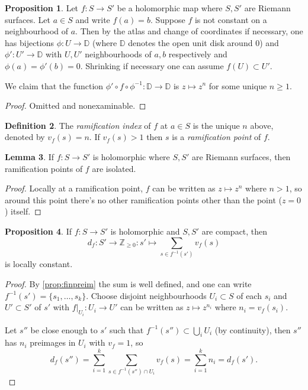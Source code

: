 \documentclass{article}
\newcommand{\D}{\mathbb{D}}
\newcommand{\Z}{\mathbb{Z}}
\theoremstyle{definition}
\newtheorem{defn}{Definition}[subsection]
\newtheorem{prop}[defn]{Proposition}
\newtheorem{lemma}[defn]{Lemma}
\begin{document}
\begin{prop}
\label{prop:zmapstozn}
Let $f:S\rightarrow S'$ be a holomorphic map where $S,S'$ are Riemann surfaces. Let $a\in S$ and write $f(a)=b$. Suppose $f$ is not constant on a neighbourhood of $a$. Then by the atlas and change of coordinates if necessary, one has bijections $\phi:U\rightarrow\D$ (where $\D$ denotes the open unit disk around 0) and $\phi':U'\rightarrow\D$ with $U,U'$ neighbourhoods of $a,b$ respectively and $\phi(a)=\phi'(b)=0$. Shrinking if necessary one can assume $f(U)\subset U'$.

We claim that the function $\phi'\circ f\circ\phi^{-1}:\D\rightarrow\D$ is $z\mapsto z^n$ for some unique $n\geq 1$.
\end{prop}
\begin{proof}
Omitted and nonexaminable.
\end{proof}

\begin{defn}
The \textit{ramification index} of $f$ at $a\in S$ is the unique $n$ above, denoted by $v_f(s)=n$. If $v_f(s)>1$ then $s$ is a \textit{ramification point} of $f$.
\end{defn}

\begin{lemma}
If $f:S\rightarrow S'$ is holomorphic where $S,S'$ are Riemann surfaces, then ramification points of $f$ are isolated.
\end{lemma}
\begin{proof}
Locally at a ramification point, $f$ can be written as $z\mapsto z^n$ where $n>1$, so around this point there's no other ramification points other than the point ($z=0$) itself.
\end{proof}

\begin{prop}
If $f:S\rightarrow S'$ is holomorphic and $S,S'$ are compact, then
\[
d_f:S'\rightarrow\Z_{\geq 0}:s'\mapsto \sum_{s\in f^{-1}(s')}v_f(s)
\]
is locally constant.
\end{prop}
\begin{proof}
By \ref{prop:finpreim} the sum is well defined, and one can write $f^{-1}(s')=\{s_1,\ldots,s_k\}$. Choose disjoint neighbourhoods $U_i\subset S$ of each $s_i$ and $U'\subset S'$ of $s'$ with $\left. f\right|_{U_i}:U_i\rightarrow U'$ can be written as $z\mapsto z^{n_i}$ where $n_i=v_f(s_i)$.

Let $s''$ be close enough to $s'$ such that $f^{-1}(s'')\subset\bigcup_iU_i$ (by continuity), then $s''$ has $n_i$ preimages in $U_i$ with $v_f=1$, so
\[
d_f(s'')=\sum_{i=1}^k\sum_{s\in f^{-1}(s'')\cap U_i} v_f(s)=\sum_{i=1}^k n_i=d_f(s').
\]
\end{proof}
\end{document}
